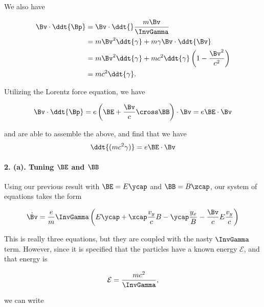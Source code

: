 {We also have

\begin{equation}\label{eqn:relElectroDynProblemSet2:1170}
\begin{aligned}
\Bv \cdot \ddt{\Bp} 
&= \Bv \cdot \ddt{} \frac{m \Bv}{\InvGamma} \\
&= m\Bv^2 \ddt{\gamma} + m \gamma \Bv \cdot \ddt{\Bv} \\
&= m\Bv^2 \ddt{\gamma} + m c^2 \ddt{\gamma} \left( 1 - \frac{\Bv^2}{c^2} \right) \\
&= m c^2 \ddt{\gamma}.
\end{aligned}
\end{equation}

Utilizing the Lorentz force equation, we have

\begin{equation}\label{eqn:relElectroDynProblemSet2:250}
\Bv \cdot \ddt{\Bp} = e \left( \BE + \frac{\Bv}{c} \cross \BB \right) \cdot \Bv = e \BE \cdot \Bv
\end{equation}

and are able to assemble the above, and find that we have
\begin{equation}\label{eqn:relElectroDynProblemSet2:270}
\ddt{(m c^2 \gamma)} = e \BE \cdot \Bv
\end{equation}

\paragraph{2. (a). Tuning \texorpdfstring{$\BE$ and $\BB$}{E and B}}

Using our previous result with $\BE = E \ycap$ and $\BB = B \zcap$, our system of equations takes the form

\begin{equation}\label{eqn:relElectroDynProblemSet2:290}
\dot{\Bv} = \frac{e}{m} \InvGamma \left( E \ycap + \xcap \frac{v_y}{c} B - \ycap \frac{y_x} B - \frac{\Bv}{c} E \frac{v_y}{c} \right)
\end{equation}

This is really three equations, but they are coupled with the nasty $\InvGamma$ term.  However, since it is specified that the particles have a known energy $\mathcal{E}$, and that energy is

\begin{equation}\label{eqn:relElectroDynProblemSet2:310}
\mathcal{E} = \frac{ m c^2 }{\InvGamma},
\end{equation}

we can write

}
